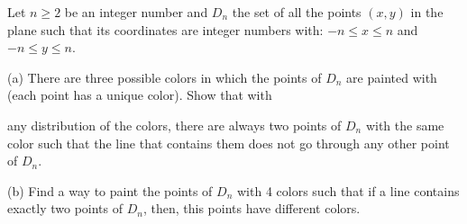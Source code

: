Let $n \geq2$ be an integer number and $D_n$ the set of all the points $(x,y)$ in the plane such that its coordinates are integer numbers with: $-n \le x \le n$ and $-n \le y \le n$.

(a) There are three possible colors in which the points of $D_n$ are painted with (each point has a unique color). Show that with

any distribution of the colors, there are always two points of $D_n$ with the same color such that the line that contains them does not go through any other point of $D_n$.

(b) Find a way to paint the points of $D_n$ with 4 colors such that if a line contains  exactly two points of $D_n$,  then, this points have different colors.